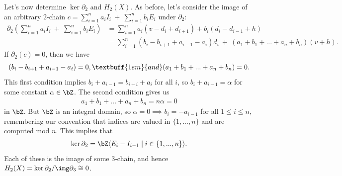 \begin{homework}[e]
\begin{prf}
    Let's now determine $\ker \partial_2$ and $H_2(X)$. As before, let's consider the image of an arbitrary $2$-chain $c = \sum_{i=1}^n a_iI_i ~+~ \sum_{i=1}^n b_iE_i$ under $\partial_2$:
    \begin{align*}
      \partial_2\left(\sum_{i=1}^n a_iI_i ~+~ \sum_{i=1}^n b_iE_i\right) 
      &= \sum_{i=1}^n a_i(v - d_i + d_{i+1}) + b_i(d_i - d_{i-1} + h) \\
      &= \sum_{i=1}^n (b_{i} - b_{i+1} + a_{i-1} - a_i)d_i ~+~ (a_1+b_1+...+a_n+b_n)(v + h).
    \end{align*}
    If $\partial_2(c) = 0$, then we have
    \begin{align*}
      (b_{i}-b_{i+1}+a_{i-1}-a_i) = 0, \textbuff{1em}{and}(a_1 + b_1 + ... + a_n + b_n) = 0.
    \end{align*}
    This first condition implies $b_i + a_{i-1} = b_{i+i} + a_{i}$ for all $i$, so $b_i + a_{i-1}= \alpha$ for some constant $\alpha \in \bZ$. The second condition gives us
    \begin{align*}
      a_1 + b_1 + ... + a_n + b_n = n \alpha = 0
    \end{align*}
    in $\bZ$. But $\bZ$ is an integral domain, so $\alpha = 0 \implies b_i = -a_{i-1}$ for all $1\leq i\leq n$, remembering our convention that indices are valued in $\{1,...,n\}$ and are computed mod $n$. This implies that
    \begin{align*}
      \ker\partial_2 = \bZ\langle E_i - I_{i-1} \mid i\in \{1,...,n\}\rangle.
    \end{align*}
    Each of these is the image of some $3$-chain, and hence $H_2(X) = \ker\partial_2/\img\partial_3 \cong 0$.

    \bigskip


\end{prf}
\end{homework}

